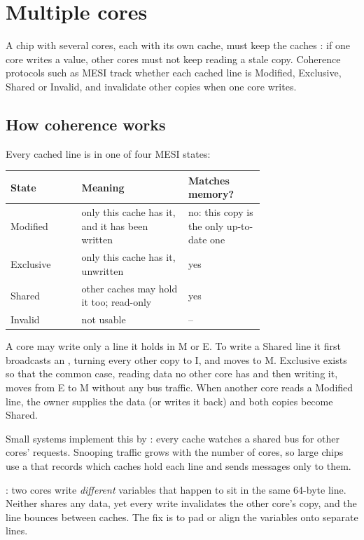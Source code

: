 \section{Multiple cores}

A chip with several cores, each with its own cache, must keep the caches : if one core writes a value, other cores must not keep reading a stale copy. Coherence protocols such as MESI track whether each cached line is Modified, Exclusive, Shared or Invalid, and invalidate other copies when one core writes.

\subsection*{How coherence works}
\label{sec:coherence}

Every cached line is in one of four MESI states:
\begin{center}
\begin{tabular}{l p{0.42\linewidth} p{0.3\linewidth}}
\toprule
\textbf{State} & \textbf{Meaning} & \textbf{Matches memory?} \\
\midrule
Modified & only this cache has it, and it has been written & no: this copy is the only up-to-date one \\
Exclusive & only this cache has it, unwritten & yes \\
Shared & other caches may hold it too; read-only & yes \\
Invalid & not usable & -- \\
\bottomrule
\end{tabular}
\end{center}
A core may write only a line it holds in M or E. To write a Shared line it first broadcasts an , turning every other copy to I, and moves to M. Exclusive exists so that the common case, reading data no other core has and then writing it, moves from E to M without any bus traffic. When another core reads a Modified line, the owner supplies the data (or writes it back) and both copies become Shared.

Small systems implement this by : every cache watches a shared bus for other cores' requests. Snooping traffic grows with the number of cores, so large chips use a  that records which caches hold each line and sends messages only to them.

\begin{trap}
: two cores write \emph{different} variables that happen to sit in the same 64-byte line. Neither shares any data, yet every write invalidates the other core's copy, and the line bounces between caches. The fix is to pad or align the variables onto separate lines.
\end{trap}

